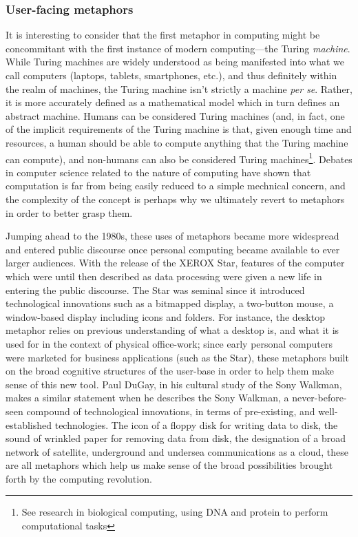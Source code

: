 \documentclass{article}
\begin{document}
\subsubsection{User-facing metaphors}

It is interesting to consider that the first metaphor in computing might be concommitant with the first instance of modern computing—the Turing \emph{machine}. While Turing machines are widely understood as being manifested into what we call computers (laptops, tablets, smartphones, etc.), and thus definitely within the realm of machines, the Turing machine isn't strictly a machine \emph{per se}. Rather, it is more accurately defined as a mathematical model which in turn defines an abstract machine. Humans can be considered Turing machines (and, in fact, one of the implicit requirements of the Turing machine is that, given enough time and resources, a human should be able to compute anything that the Turing machine can compute), and non-humans can also be considered Turing machines\footnote{See research in biological computing, using DNA and protein to perform computational tasks}. Debates in computer science related to the nature of computing\cite{rapaport_philosophy_2005} have shown that computation is far from being easily reduced to a simple mechnical concern, and the complexity of the concept is perhaps why we ultimately revert to metaphors in order to better grasp them.

Jumping ahead to the 1980s, these uses of metaphors became more widespread and entered public discourse once personal computing became available to ever larger audiences. With the release of the XEROX Star, features of the computer which were until then described as data processing were given a new life in entering the public discourse. The Star was seminal since it introduced technological innovations such as a bitmapped display, a two-button mouse, a window-based display including icons and folders. For instance, the desktop metaphor relies on previous understanding of what a desktop is, and what it is used for in the context of physical office-work; since early personal computers were marketed for business applications (such as the Star), these metaphors built on the broad cognitive structures of the user-base in order to help them make sense of this new tool. Paul DuGay, in his cultural study of the Sony Walkman, makes a similar statement when he describes the Sony Walkman, a never-before-seen compound of technological innovations, in terms of pre-existing, and well-established technologies\cite{gay_doing_2013}. The icon of a floppy disk for writing data to disk, the sound of wrinkled paper for removing data from disk, the designation of a broad network of satellite, underground and undersea communications as a cloud, these are all metaphors which help us make sense of the broad possibilities brought forth by the computing revolution.
\end{document}
